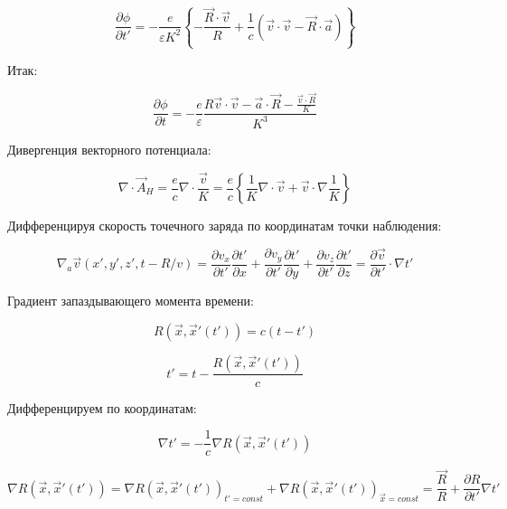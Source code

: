 \documentclass[12pt, a4paper]{article}
\begin{document}
\begin{equation}
\frac{\partial \phi}{\partial t'} = -\frac{e}{\varepsilon K^2} \left\{ -\frac{\vec{R} \cdot \vec{v}}{R} + \frac{1}{c} (\vec{v} \cdot \vec{v} - \vec{R} \cdot \vec{a}) \right\}
\label{eq:phi_t_prime}
\end{equation}

Итак:

\begin{equation}
\frac{\partial \phi}{\partial t} = -\frac{e}{\varepsilon} \frac{R \vec{v} \cdot \vec{v} - \vec{a} \cdot \vec{R} - \frac{\vec{v} \cdot \vec{R}}{K}}{K^3}
\label{eq:phi_t_final}
\end{equation}

Дивергенция векторного потенциала:

\begin{equation}
\nabla \cdot \vec{A}_H = \frac{e}{c} \nabla \cdot \frac{\vec{v}}{K} = \frac{e}{c} \left\{ \frac{1}{K} \nabla \cdot \vec{v} + \vec{v} \cdot \nabla \frac{1}{K} \right\}
\label{eq:div_A_start}
\end{equation}

Дифференцируя скорость точечного заряда по координатам точки наблюдения:

\begin{equation}
\nabla_a \vec{v}(x', y', z', t - R/v) = \frac{\partial v_x}{\partial t'} \frac{\partial t'}{\partial x} + \frac{\partial v_y}{\partial t'} \frac{\partial t'}{\partial y} + \frac{\partial v_z}{\partial t'} \frac{\partial t'}{\partial z} = \frac{\partial \vec{v}}{\partial t'} \cdot \nabla t'
\label{eq:v_gradient}
\end{equation}

Градиент запаздывающего момента времени:

\begin{equation}
R(\vec{x}, \vec{x}'(t')) = c(t - t')
\label{eq:R_definition}
\end{equation}

\begin{equation}
t' = t - \frac{R(\vec{x}, \vec{x}'(t'))}{c}
\label{eq:t_prime_definition}
\end{equation}

Дифференцируем по координатам:

\begin{equation}
\nabla t' = -\frac{1}{c} \nabla R(\vec{x}, \vec{x}'(t'))
\label{eq:grad_t}
\end{equation}

\begin{equation}
\nabla R(\vec{x}, \vec{x}'(t')) = \nabla R(\vec{x}, \vec{x}'(t'))_{t'=const} + \nabla R(\vec{x}, \vec{x}'(t'))_{\vec{x}=const} = \frac{\vec{R}}{R} + \frac{\partial R}{\partial t'} \nabla t'
\label{eq:grad_R}
\end{equation}
\end{document}
